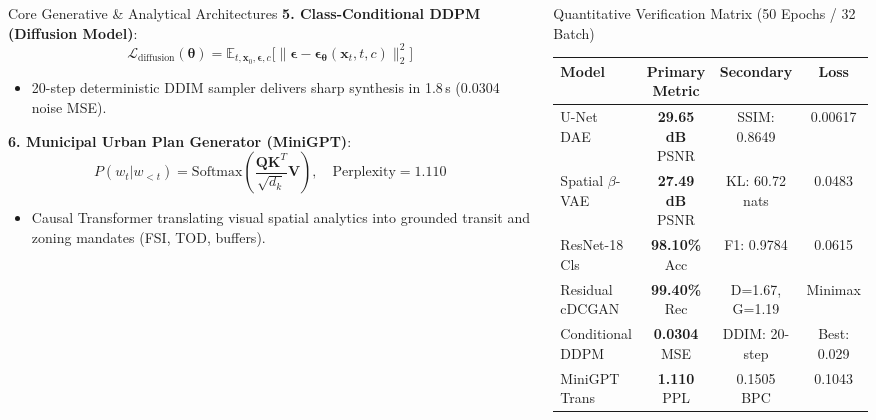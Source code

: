 \documentclass[final]{beamer}
\begin{document}
\begin{frame}[t]
\begin{columns}[t]
\begin{column}{0.35\textwidth}
\begin{block}{Core Generative \& Analytical Architectures}
      \textbf{5. Class-Conditional DDPM (Diffusion Model)}:
      $$\mathcal{L}_{\text{diffusion}}(\boldsymbol{\theta}) = \mathbb{E}_{t, \mathbf{x}_0, \boldsymbol{\epsilon}, c}\Big[\big\|\boldsymbol{\epsilon} - \boldsymbol{\epsilon}_{\boldsymbol{\theta}}(\mathbf{x}_t, t, c)\big\|_2^2\Big]$$
      \begin{itemize}
        \item 20-step deterministic DDIM sampler delivers sharp synthesis in 1.8\,s (0.0304 noise MSE).
      \end{itemize}
      \vspace{0.4cm}

      \textbf{6. Municipal Urban Plan Generator (MiniGPT)}:
      $$P(w_t | w_{<t}) = \text{Softmax}\left(\frac{\mathbf{Q}\mathbf{K}^T}{\sqrt{d_k}} \mathbf{V}\right), \quad \text{Perplexity} = 1.110$$
      \begin{itemize}
        \item Causal Transformer translating visual spatial analytics into grounded transit and zoning mandates (FSI, TOD, buffers).
      \end{itemize}
    \end{block}

  \end{column}

  \begin{column}{0.31\textwidth}

    \begin{block}{Quantitative Verification Matrix (50 Epochs / 32 Batch)}
      \centering
      \small
      \begin{tabularx}{\columnwidth}{@{}l c c c@{}}
        \toprule
        \textbf{Model} & \textbf{Primary Metric} & \textbf{Secondary} & \textbf{Loss} \\
        \midrule
        U-Net DAE & \textbf{29.65 dB} PSNR & SSIM: 0.8649 & 0.00617 \\
        Spatial $\beta$-VAE & \textbf{27.49 dB} PSNR & KL: 60.72 nats & 0.0483 \\
        ResNet-18 Cls & \textbf{98.10\%} Acc & F1: 0.9784 & 0.0615 \\
        Residual cDCGAN & \textbf{99.40\%} Rec & D=1.67, G=1.19 & Minimax \\
        Conditional DDPM & \textbf{0.0304} MSE & DDIM: 20-step & Best: 0.029 \\
        MiniGPT Trans & \textbf{1.110} PPL & 0.1505 BPC & 0.1043 \\
        \bottomrule
      \end{tabularx}
    \end{block}


\end{column}
\end{columns}
\end{frame}
\end{document}
